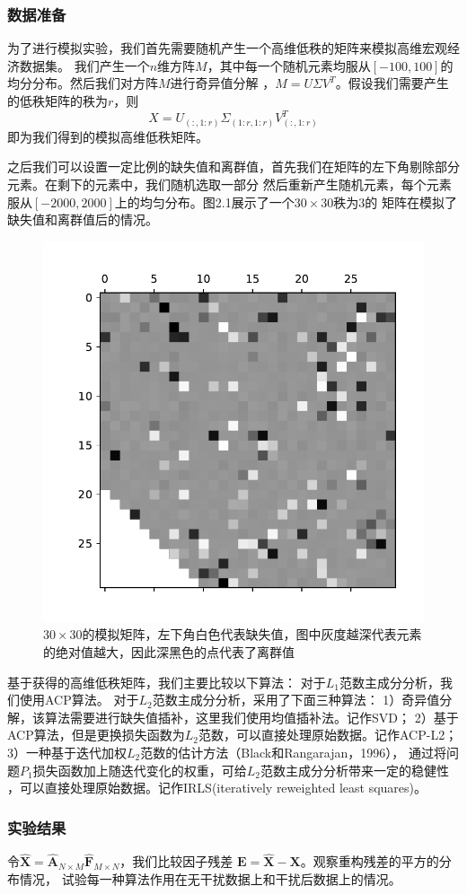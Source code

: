\subsubsection{数据准备}
为了进行模拟实验，我们首先需要随机产生一个高维低秩的矩阵来模拟高维宏观经济数据集。
我们产生一个$n$维方阵$M$，其中每一个随机元素均服从$[-100, 100]$的均分分布。然后我们对方阵$M$进行奇异值分解
，$M = U\Sigma V^{T}$。假设我们需要产生的低秩矩阵的秩为$r$，则$$X = U_{(:,1:r)}\Sigma_{(1:r,1:r)}V^T_{(:,1:r)}$$
即为我们得到的模拟高维低秩矩阵。

之后我们可以设置一定比例的缺失值和离群值，首先我们在矩阵的左下角剔除部分元素。在剩下的元素中，我们随机选取一部分
然后重新产生随机元素，每个元素服从$[-2000,2000]$上的均匀分布。图2.1展示了一个$30\times30$秩为3的
矩阵在模拟了缺失值和离群值后的情况。

\begin{figure}[H]
    \centering
    \includegraphics[width=.5\textwidth]{pics/chapter2/matrix.pdf}
    \caption{\small $30\times30$的模拟矩阵，左下角白色代表缺失值，图中灰度越深代表元素的绝对值越大，因此深黑色的点代表了离群值}
    \label{fig2.1}
\end{figure}

基于获得的高维低秩矩阵，我们主要比较以下算法：
对于$L_1$范数主成分分析，我们使用ACP算法。
对于$L_2$范数主成分分析，采用了下面三种算法：
1）奇异值分解，该算法需要进行缺失值插补，这里我们使用均值插补法。记作SVD；
2）基于ACP算法，但是更换损失函数为$L_2$范数，可以直接处理原始数据。记作ACP-L2；
3）一种基于迭代加权$L_2$范数的估计方法（Black和Rangarajan，1996），
通过将问题$P_1$损失函数加上随迭代变化的权重，可给$L_2$范数主成分分析带来一定的稳健性
，可以直接处理原始数据。记作IRLS(iteratively reweighted least squares)。

\subsubsection{实验结果}
令$\hat{\bm{X}} = \hat{\bm{A}}_{N \times M}\hat{\bm{F}}_{M \times N}$，我们比较因子残差
$\bm{E} = \hat{\bm{X}} -\bm{X}$。观察重构残差的平方的分布情况，
试验每一种算法作用在无干扰数据上和干扰后数据上的情况。

